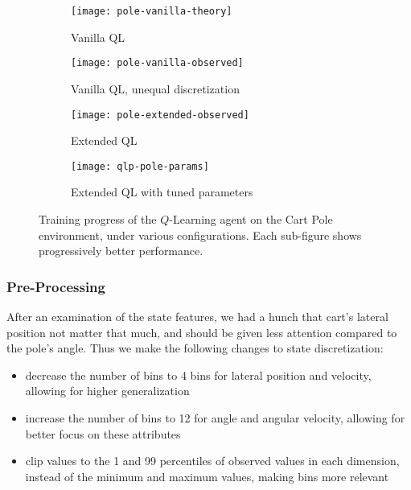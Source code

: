 \documentclass{article}
\begin{document}
\begin{figure}[h]
\begin{adjustwidth}{-3cm}{-2.5cm}

\begin{subfigure}[t]{0.49\linewidth}
  \texttt{[image: pole-vanilla-theory]}
  \caption{Vanilla QL}
  \label{fig:ql-pole}
\end{subfigure}\hfill %
\begin{subfigure}[t]{0.49\linewidth}
  \texttt{[image: pole-vanilla-observed]}
  \caption{Vanilla QL, unequal discretization}
  \label{fig:ql-pole-discr}
\vspace{2em}
\end{subfigure}

\begin{subfigure}[t]{0.49\linewidth}
  \texttt{[image: pole-extended-observed]}
  \caption{Extended QL}
  \label{fig:qlp-pole-discr}
\end{subfigure}\hfill
\begin{subfigure}[t]{0.49\linewidth}
  \texttt{[image: qlp-pole-params]}
  \caption{Extended QL with tuned parameters}
  \label{fig:qlp-pole-params}
\end{subfigure}

\end{adjustwidth}

\caption{Training progress of the $Q$-Learning agent on the Cart Pole environment, under various configurations. Each sub-figure shows progressively better performance.}

\end{figure}

\subsubsection{Pre-Processing}

After an examination of the state features, we had a hunch that cart's lateral position not matter that much, and should be given less attention compared to the pole's angle. Thus we make the following changes to state discretization:
\begin{itemize}
  \item decrease the number of bins to 4 bins for lateral position and velocity, allowing for higher generalization
  \item increase the number of bins to 12 for angle and angular velocity, allowing for better focus on these attributes
  \item clip values to the 1 and 99 percentiles of observed values in each dimension, instead of the minimum and maximum values, making bins more relevant
\end{itemize}
\end{document}
